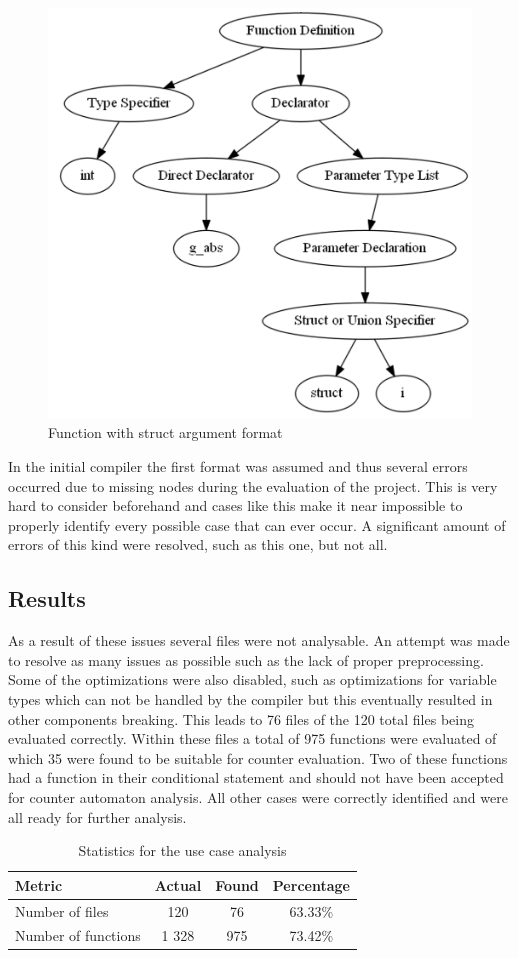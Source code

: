 \documentclass[12pt]{article}
\begin{document}
\begin{figure}[h]
	\centering
	\includegraphics[width=0.4\linewidth]{images/not_normal_function_param.png}
	\caption{Function with struct argument format}
	\label{fig:struct arguments}
\end{figure}

In the initial compiler the first format was assumed and thus several errors occurred due to missing nodes during the evaluation of the project. This is very hard to consider beforehand and cases like this make it near impossible to properly identify every possible case that can ever occur. A significant amount of errors of this kind were resolved, such as this one, but not all.

\subsection{Results}
As a result of these issues several files were not analysable. An attempt was made to resolve as many issues as possible such as the lack of proper preprocessing. Some of the optimizations were also disabled, such as optimizations for variable types which can not be handled by the compiler but this eventually resulted in other components breaking. This leads to 76 files of the 120 total files being evaluated correctly. Within these files a total of 975 functions were evaluated of which 35 were found to be suitable for counter evaluation. Two of these functions had a function in their conditional statement and should not have been accepted for counter automaton analysis. All other cases were correctly identified and were all ready for further analysis.

\begin{table}[h]
	\centering
	\begin{tabular}{ |p{4.5cm}|c|c|c|  }
		\hline
		Metric 				& Actual & Found & Percentage\\
		\hline
		Number of files 	& 120	 & 76 & 63.33\%\\
		\hline
		Number of functions & 1 328	 & 975 & 73.42\%\\
		\hline
	\end{tabular}
	\caption{Statistics for the use case analysis}
\end{table}
\end{document}
